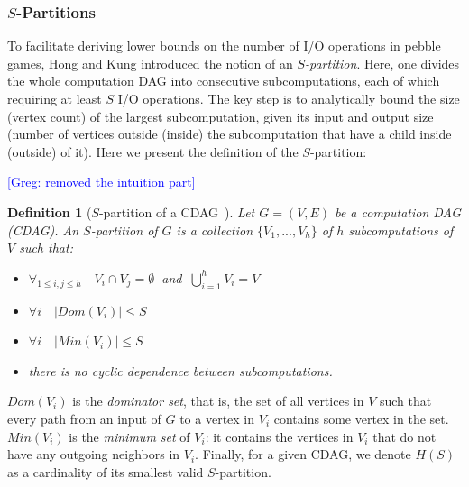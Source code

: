 \documentclass[sigplan,review,anonymous]{acmart}\settopmatter{printfolios=true,printccs=false,printacmref=false}
\newcommand\greg[1]{\textcolor{blue}{[Greg: #1]}}
\newtheorem{defn}{Definition}
\newcommand{\macb}[1]{\textbf{\textsf{#1}}}
\begin{document}
\subsubsection{$S$-Partitions}

To facilitate deriving lower bounds on the number of I/O operations in pebble
games, Hong and Kung introduced the notion of an \emph{$S$-partition}. Here,
one divides the whole computation DAG into consecutive subcomputations, each of
which requiring at least $S$ I/O operations.  The key step is to analytically
bound the size (vertex count) of the largest subcomputation, given its input
and output size (number of vertices outside (inside) the subcomputation that
have a child inside (outside) of it). 
%
Here we present the definition of the $S$-partition:

\greg{removed the intuition part}

\begin{defn}[$S$-partition of a CDAG~\cite{redblue}]
\label{df:s-partition}
Let $G = (V,E)$ be a computation DAG (CDAG). An $S$-partition of $G$ 
is a collection $\{V_1, ..., V_h\}$ of $h$ subcomputations of $ V$ such that:
  
\begin{itemize}
\item $\forall_{1 \le i,j \le h}\quad V_i \cap V_j =\emptyset\ $ and $\ 
\bigcup_{i=1}^{h} V_i=V$
\item $\forall i\quad |Dom(V_i)| \le S$
\item $\forall i\quad |Min(V_i)| \le S$
\item there is no cyclic dependence between subcomputations.
\end{itemize}
\end{defn}

$Dom(V_i)$ is the \emph{dominator set}, that is, the set of all vertices in $V$
such that every path from an input of $G$ to a vertex in $V_i$ contains some
vertex in the set.
%
$Min(V_i)$ is the
\emph{minimum set} of $V_i$: it contains the vertices in $V_i$ that do not have
any outgoing neighbors in $V_i$. 
%
%
Finally, for a given CDAG, we 
denote $H(S)$ as a cardinality of its smallest valid $S$-partition.
\end{document}
